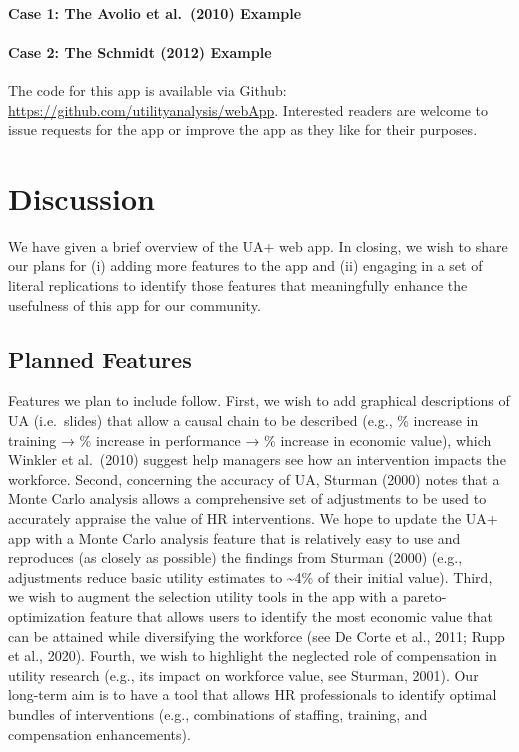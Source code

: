 \documentclass[
]{article}
\begin{document}
\paragraph{Case 1: The Avolio et al.~(2010)
Example}\label{case-1-the-avolio-et-al.-2010-example}

\paragraph{Case 2: The Schmidt (2012)
Example}\label{case-2-the-schmidt-2012-example}

The code for this app is available via Github:
\url{https://github.com/utilityanalysis/webApp}. Interested readers are
welcome to issue requests for the app or improve the app as they like
for their purposes.

\section{Discussion}\label{discussion}

We have given a brief overview of the UA+ web app. In closing, we wish
to share our plans for (i) adding more features to the app and (ii)
engaging in a set of literal replications to identify those features
that meaningfully enhance the usefulness of this app for our community.

\subsection{Planned Features}\label{planned-features}

Features we plan to include follow. First, we wish to add graphical
descriptions of UA (i.e.~slides) that allow a causal chain to be
described (e.g., \% increase in training → \% increase in performance →
\% increase in economic value), which Winkler et al.~(2010) suggest help
managers see how an intervention impacts the workforce. Second,
concerning the accuracy of UA, Sturman (2000) notes that a Monte Carlo
analysis allows a comprehensive set of adjustments to be used to
accurately appraise the value of HR interventions. We hope to update the
UA+ app with a Monte Carlo analysis feature that is relatively easy to
use and reproduces (as closely as possible) the findings from Sturman
(2000) (e.g., adjustments reduce basic utility estimates to
\textasciitilde4\% of their initial value). Third, we wish to augment
the selection utility tools in the app with a pareto-optimization
feature that allows users to identify the most economic value that can
be attained while diversifying the workforce (see De Corte et al., 2011;
Rupp et al., 2020). Fourth, we wish to highlight the neglected role of
compensation in utility research (e.g., its impact on workforce value,
see Sturman, 2001). Our long-term aim is to have a tool that allows HR
professionals to identify optimal bundles of interventions (e.g.,
combinations of staffing, training, and compensation enhancements).
\end{document}
